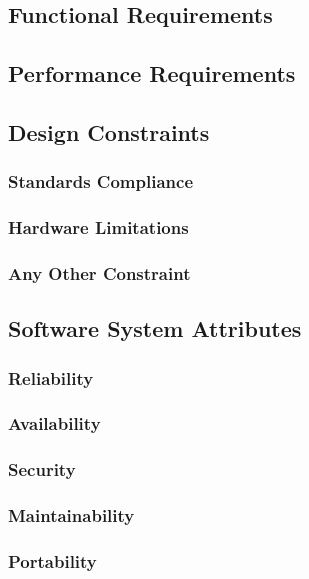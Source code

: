 \documentclass[a4paper]{article}
\begin{document}
\subsection{Functional Requirements}
\subsection{Performance Requirements}
\subsection{Design Constraints}
\subsubsection{Standards Compliance}
\subsubsection{Hardware Limitations}
\subsubsection{Any Other Constraint}
\subsection{Software System Attributes}
\subsubsection{Reliability}
\subsubsection{Availability}
\subsubsection{Security}
\subsubsection{Maintainability}
\subsubsection{Portability}
\end{document}

